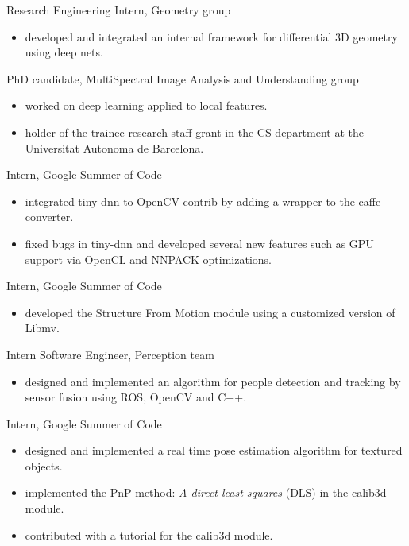 \documentclass{article}
\begin{document}
\begin{llist}
Research Engineering Intern, Geometry group
\vspace{-0.33cm}
\begin{itemize}
 \item developed and integrated an internal framework for differential 3D geometry using deep nets.
\end{itemize}

PhD candidate, MultiSpectral Image Analysis and Understanding group
\vspace{-0.33cm}
\begin{itemize}
 \item worked on deep learning applied to local features.
 \item holder of the trainee research staff grant in the CS department at the Universitat Autonoma de Barcelona.
\end{itemize}

Intern, Google Summer of Code
\vspace{-0.33cm}
\begin{itemize}
 \item integrated tiny-dnn to OpenCV contrib by adding a wrapper to the caffe converter.
 \item fixed bugs in tiny-dnn and developed several new features such as GPU support via OpenCL and NNPACK optimizations.
\end{itemize}

Intern, Google Summer of Code
\vspace{-0.33cm}
\begin{itemize}
 \item developed the Structure From Motion module using a customized version of Libmv.
\end{itemize}

Intern Software Engineer, Perception team
\vspace{-0.33cm}
\begin{itemize}
 \item designed and implemented an algorithm for people detection and tracking by sensor fusion using ROS, OpenCV and C++.
\end{itemize}

Intern, Google Summer of Code
\vspace{-0.33cm}
\begin{itemize}
 \item designed and implemented a real time pose estimation algorithm for textured objects.
 \item implemented the PnP method: \textit{A direct least-squares} (DLS) in the calib3d module.
 \item contributed with a tutorial for the calib3d module.
\end{itemize}


\end{llist}
\end{document}
